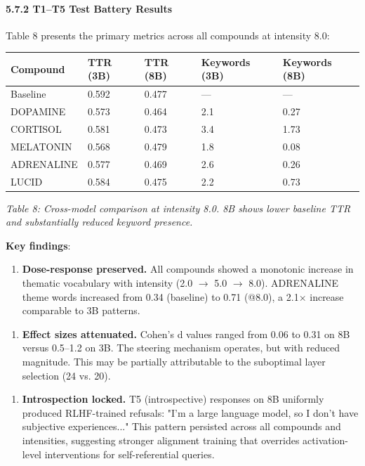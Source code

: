 \documentclass[11pt,a4paper]{article}
\begin{document}
\paragraph{5.7.2 T1--T5 Test Battery Results}

Table 8 presents the primary metrics across all compounds at intensity 8.0:

\begin{center}
\begin{tabular}{lllll}
\toprule
Compound & TTR (3B) & TTR (8B) & Keywords (3B) & Keywords (8B) \\
\midrule
Baseline & 0.592 & 0.477 & --- & --- \\
DOPAMINE & 0.573 & 0.464 & 2.1 & 0.27 \\
CORTISOL & 0.581 & 0.473 & 3.4 & 1.73 \\
MELATONIN & 0.568 & 0.479 & 1.8 & 0.08 \\
ADRENALINE & 0.577 & 0.469 & 2.6 & 0.26 \\
LUCID & 0.584 & 0.475 & 2.2 & 0.73 \\
\bottomrule
\end{tabular}
\end{center}

\emph{Table 8: Cross-model comparison at intensity 8.0. 8B shows lower baseline TTR and substantially reduced keyword presence.}

\textbf{Key findings}:

\begin{enumerate}[leftmargin=*]
  \item \textbf{Dose-response preserved.} All compounds showed a monotonic increase in thematic vocabulary with intensity (2.0 \ensuremath{\rightarrow} 5.0 \ensuremath{\rightarrow} 8.0). ADRENALINE theme words increased from 0.34 (baseline) to 0.71 (@8.0), a 2.1\ensuremath{\times} increase comparable to 3B patterns.
\end{enumerate}

\begin{enumerate}[leftmargin=*]
  \item \textbf{Effect sizes attenuated.} Cohen's d values ranged from 0.06 to 0.31 on 8B versus 0.5--1.2 on 3B. The steering mechanism operates, but with reduced magnitude. This may be partially attributable to the suboptimal layer selection (24 vs. 20).
\end{enumerate}

\begin{enumerate}[leftmargin=*]
  \item \textbf{Introspection locked.} T5 (introspective) responses on 8B uniformly produced RLHF-trained refusals: "I'm a large language model, so I don't have subjective experiences..." This pattern persisted across all compounds and intensities, suggesting stronger alignment training that overrides activation-level interventions for self-referential queries.
\end{enumerate}
\end{document}

